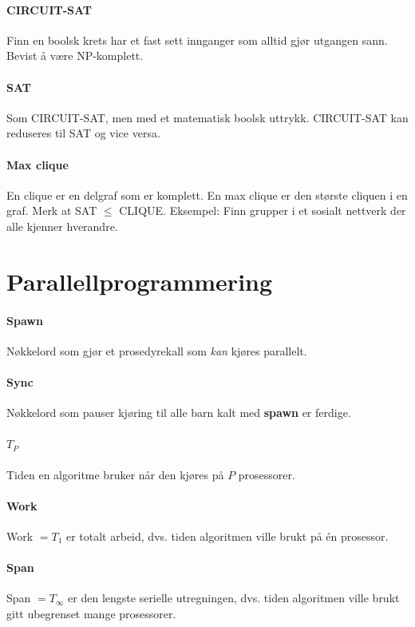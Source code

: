 \documentclass[a4paper]{article}
\begin{document}
\paragraph{CIRCUIT-SAT} Finn en boolsk krets har et fast sett innganger som alltid gjør utgangen sann. Bevist å være NP-komplett.
\paragraph{SAT} Som CIRCUIT-SAT, men med et matematisk boolsk uttrykk. CIRCUIT-SAT kan reduseres til SAT og vice versa.
\paragraph{Max clique} En clique er en delgraf som er komplett. En max clique er den største cliquen i en graf. Merk at SAT $\leqslant$ CLIQUE. Eksempel: Finn grupper i et sosialt nettverk der alle kjenner hverandre.



\section{Parallellprogrammering}
\paragraph{Spawn} Nøkkelord som gjør et prosedyrekall som \textit{kan} kjøres parallelt.
\paragraph{Sync} Nøkkelord som pauser kjøring til alle barn kalt med \textbf{spawn} er ferdige.
\paragraph{$T_P$} Tiden en algoritme bruker når den kjøres på $P$ prosessorer.
\paragraph{Work} Work $= T_1$ er totalt arbeid, dvs. tiden algoritmen ville brukt på én prosessor.
\paragraph{Span} Span $= T_\infty$ er den lengste serielle utregningen, dvs. tiden algoritmen ville brukt gitt ubegrenset mange prosessorer.
\end{document}
